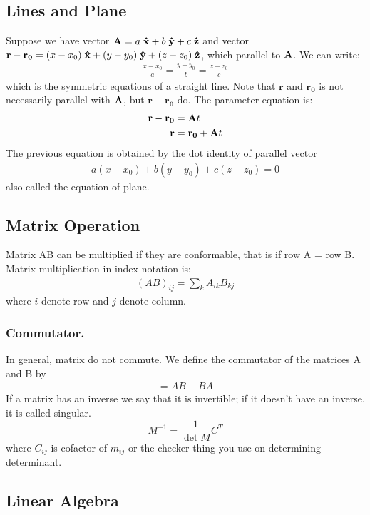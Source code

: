 \documentclass[../main.tex]{subfiles}
\begin{document}
\subsection*{Lines and Plane}
Suppose we have vector $\mathbf{A}=a\;\mathbf{\hat{x}}+b\;\mathbf{\hat{y}} +c\;\mathbf{\hat{z}}$ and vector $\mathbf{r}-\mathbf{r_0}=(x-x_0)\;\mathbf{\hat{x}}+(y-y_0)\;\mathbf{\hat{y}} +(z-z_0)\;\mathbf{\hat{z}}$, which parallel to $\mathbf{A}$.
We can write:
\begin{align*}
	\frac{x-x_0}{a}=\frac{y-y_0}{b}=\frac{z-z_0}{c}
\end{align*}
which is the symmetric equations of a straight line.
Note that $\mathbf{r}$ and $\mathbf{r_0}$ is not necessarily parallel with $\mathbf{A}$, but $\mathbf{r}-\mathbf{r_0}$ do.
The parameter equation is:
\begin{align*}
	\mathbf{r}-\mathbf{r_0} & =\mathbf{A} t              \\
	\mathbf{r}              & =\mathbf{r_0}+\mathbf{A} t
\end{align*}
The previous equation is obtained by the dot identity of parallel vector
\begin{align*}
	a(x-x_0)+b(y-y_0)+c(z-z_0)=0
\end{align*}
also called the equation of plane.

\subsection*{Matrix Operation}
Matrix AB can be multiplied if they are conformable, that is if row A = row B.
Matrix multiplication in index notation is:
\begin{align*}
	(AB)_{ij}=\sum_{k}A_{ik}B_{kj}
\end{align*}
where $i$ denote row and $j$ denote column.

\subsubsection*{Commutator.} 
In general, matrix do not commute. We define the commutator of the matrices A and B by
\begin{align*}
	[A, B] = AB - BA
\end{align*}
If a matrix has an inverse we say that it is invertible; if it doesn't have an inverse, it is called singular.
\begin{equation*}
	M^{-1}=\frac{1}{\det M}C^{T}
\end{equation*}
where $C_{ij}$ is cofactor of $m_{ij}$ or the checker thing you use on determining determinant.

\subsection*{Linear Algebra}
\end{document}
